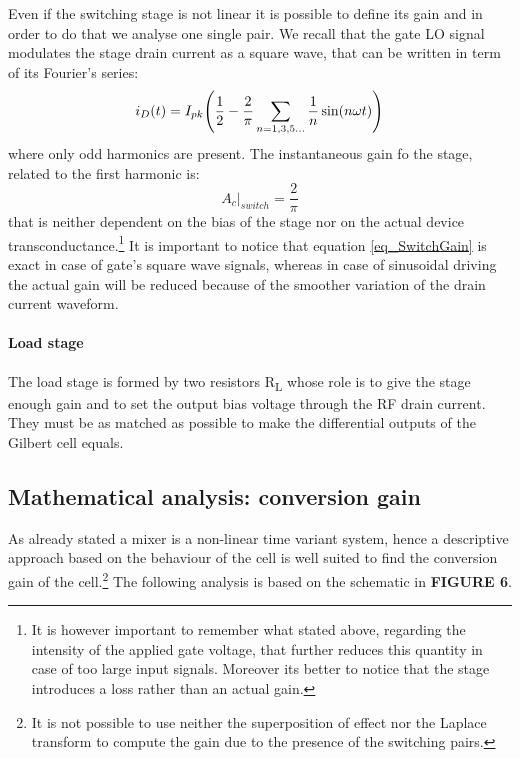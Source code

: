 Even if the switching stage is not linear it is possible to define its gain and in order to do that we analyse one single pair. We recall that the gate LO signal modulates the stage drain current as a square wave, that can be written in term of its Fourier's series:
\begin{equation}
 i_D(t)=I_{pk}\Bigg(\frac{1}{2}-\frac{2}{\pi} \sum_{n=1,3,5 \dots}^{} \frac{1}{n}\sin(n\omega t)\Bigg) \notag
\end{equation} 
where only odd harmonics are present. The instantaneous gain fo the stage, related to the first harmonic is:
\begin{equation}
\label{eq_SwitchGain}
A_c|_{switch} = \frac{2}{\pi}
\end{equation}
that is neither dependent on the bias of the stage nor on the actual device transconductance.\footnote{It is however important to remember what stated above, regarding the intensity of the applied gate voltage, that further reduces this quantity in case of too large input signals. Moreover its better to notice that the stage introduces a loss rather than an actual gain.} It is important to notice that equation \ref{eq_SwitchGain} is exact in case of gate's square wave signals, whereas in case of sinusoidal driving the actual gain will be reduced because of the smoother variation of the drain current waveform.

\paragraph{Load stage} 
The load stage is formed by two resistors R\textsubscript{L} whose role is to give the stage enough gain and to set the output bias voltage through the RF drain current. They must be as matched as possible to make the differential outputs of the Gilbert cell equals.


\subsection{Mathematical analysis: conversion gain}

As already stated a mixer is a non-linear time variant system, hence a descriptive approach based on the behaviour of the cell is well suited to find the conversion gain of the cell.\footnote{It is not possible to use neither the superposition of effect nor the Laplace transform to compute the gain due to the presence of the switching pairs.} 
The following analysis is based on the schematic in \textbf{FIGURE 6}.

